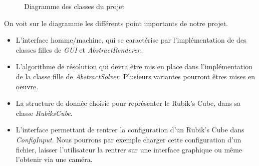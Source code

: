 \begin{figure}[H]
\begin{center}
\end{center}
    \caption{Diagramme des classes du projet}
\end{figure}

On voit sur le diagramme les différents point importants de notre projet. 
\begin{itemize}
    \item L'interface homme/machine, qui se caractérise par l'implémentation de des classes filles de \textit{GUI} et \textit{AbstractRenderer}.
    \item L'algorithme de résolution qui devra être mis en place dans l'implémentation de la classe fille de \textit{AbstractSolver}. Plusieurs variantes pourront êtres mises en oeuvre.
    \item La structure de donnée choisie pour représenter le Rubik's Cube, dans sa classe \textit{RubiksCube}.
    \item L'interface permettant de rentrer la configuration d'un Rubik's Cube dans \textit{ConfigInput}. Nous pourrons par exemple charger cette configuration d'un fichier, laisser l'utilisateur la rentrer sur une interface graphique ou même l'obtenir via une caméra.
\end{itemize}

